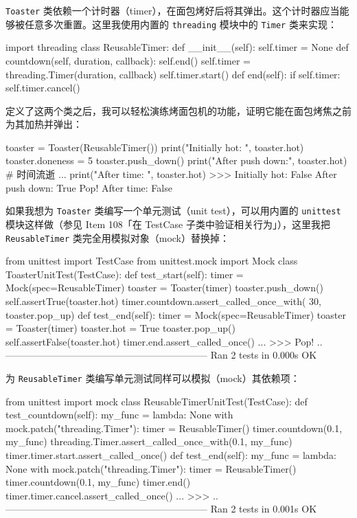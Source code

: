 \texttt{Toaster} 类依赖一个计时器（timer），在面包烤好后将其弹出。这个计时器应当能够被任意多次重置。这里我使用内置的 \texttt{threading} 模块中的 \texttt{Timer} 类来实现：

\begin{codebox}[python]
import threading
class ReusableTimer:
    def __init__(self):
        self.timer = None
    def countdown(self, duration, callback):
        self.end()
        self.timer = threading.Timer(duration, callback)
        self.timer.start()
    def end(self):
        if self.timer:
            self.timer.cancel()
\end{codebox}

定义了这两个类之后，我可以轻松演练烤面包机的功能，证明它能在面包烤焦之前为其加热并弹出：

\begin{codebox}[python]
toaster = Toaster(ReusableTimer())
print("Initially hot:  ", toaster.hot)
toaster.doneness = 5
toaster.push_down()
print("After push down:", toaster.hot)
# 时间流逝
...
print("After time:     ", toaster.hot)
>>>
Initially hot:   False
After push down: True
Pop!
After time:      False
\end{codebox}

如果我想为 \texttt{Toaster} 类编写一个单元测试（unit test），可以用内置的 \texttt{unittest} 模块这样做（参见 Item 108「在 TestCase 子类中验证相关行为」），这里我把 \texttt{ReusableTimer} 类完全用模拟对象（mock）替换掉：

\begin{codebox}[python]
from unittest import TestCase
from unittest.mock import Mock
class ToasterUnitTest(TestCase):
    def test_start(self):
        timer = Mock(spec=ReusableTimer)
        toaster = Toaster(timer)
        toaster.push_down()
        self.assertTrue(toaster.hot)
         timer.countdown.assert_called_once_with(
     30, toaster.pop_up)
    def test_end(self):
        timer = Mock(spec=ReusableTimer)
        toaster = Toaster(timer)
        toaster.hot = True
        toaster.pop_up()
        self.assertFalse(toaster.hot)
        timer.end.assert_called_once()
...
>>>
Pop!
..
---------------------------------------------------------------
Ran 2 tests in 0.000s
OK
\end{codebox}

为 \texttt{ReusableTimer} 类编写单元测试同样可以模拟（mock）其依赖项：

\begin{codebox}[python]
from unittest import mock
class ReusableTimerUnitTest(TestCase):
    def test_countdown(self):
        my_func = lambda: None
        with mock.patch("threading.Timer"):
            timer = ReusableTimer()
            timer.countdown(0.1, my_func)
            threading.Timer.assert_called_once_with(0.1, my_func)
            timer.timer.start.assert_called_once()
    def test_end(self):
        my_func = lambda: None
        with mock.patch("threading.Timer"):
            timer = ReusableTimer()
            timer.countdown(0.1, my_func)
            timer.end()
            timer.timer.cancel.assert_called_once()
...
>>>
..
---------------------------------------------------------------
Ran 2 tests in 0.001s
OK
\end{codebox}

